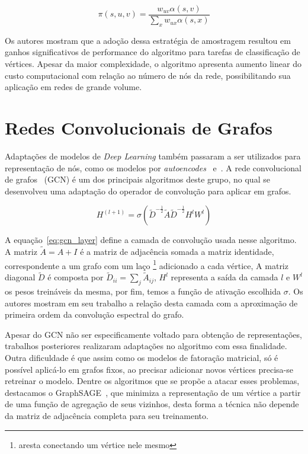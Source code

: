 \begin{equation} \label{eq:node2vec_pi}
    \pi(s, u, v) = \frac{w_{uv} \alpha(s,v)}{\sum_{x} w_{ux} \alpha(s,x)}
\end{equation}

Os autores mostram que a adoção dessa estratégia de amostragem resultou em
ganhos significativos de performance do algoritmo para tarefas de classificação
de vértices.
Apesar da maior complexidade, o algoritmo apresenta aumento linear do custo
computacional com relação ao número de nós da rede, possibilitando sua aplicação
em redes de grande volume.

\section{Redes Convolucionais de Grafos}

Adaptações de modelos de \textit{Deep Learning} também passaram a ser utilizados
para representação de nós, como os modelos por \textit{autoencodes}~\cite{wang16}
e~\cite{cao16}.
A rede convolucional de grafos~\cite{kipf16} (GCN) é um dos principais algoritmos
deste grupo, no qual se desenvolveu uma adaptação do operador de convolução para
aplicar em grafos.

\begin{equation} \label{eq:gcn_layer}
    H^{(l+1)} = \sigma (\tilde{D}^{-\frac{1}{2}} \tilde{A} \tilde{D}^{-\frac{1}{2}} H^l W^l)
\end{equation}

A equação~\ref{eq:gcn_layer} define a camada de convolução usada nesse
algoritmo.
A matriz $\tilde{A} = A + I$ é a matriz de adjacência somada a matriz
identidade, correspondente a um grafo com um laço \footnote{aresta conectando um
vértice nele mesmo} adicionado a cada vértice, A matriz diagonal $\tilde{D}$ é
composta por $\tilde{D}_{ii} = \sum_{j}\tilde{A}_{ij}$, $H^l$ representa a saída
da camada $l$ e $W^l$ os pesos treináveis da mesma, por fim, temos a função de
ativação escolhida $\sigma$.
Os autores mostram em seu trabalho a relação desta camada com a aproximação de
primeira ordem da convolução espectral do grafo.

Apesar do GCN não ser especificamente voltado para obtenção de representações,
trabalhos posteriores realizaram adaptações no algoritmo com essa finalidade.
Outra dificuldade é que assim como os modelos de fatoração matricial, só é
possível aplicá-lo em grafos fixos, ao precisar adicionar novos vértices
precisa-se retreinar o modelo.
Dentre os algoritmos que se propõe a atacar esses problemas, destacamos o
GraphSAGE~\cite{hamilton17}, que minimiza a representação de um vértice a partir
de uma função de agregação de seus vizinhos, desta forma a técnica não depende
da matriz de adjacência completa para seu treinamento.
